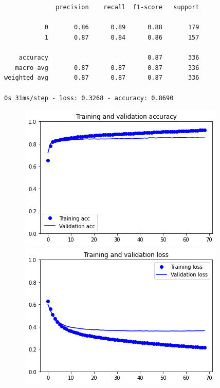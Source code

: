 \documentclass{article}
\begin{document}
\begin{verbatim}


              precision    recall  f1-score   support

           0       0.86      0.89      0.88       179
           1       0.87      0.84      0.86       157

    accuracy                           0.87       336
   macro avg       0.87      0.87      0.87       336
weighted avg       0.87      0.87      0.87       336

0s 31ms/step - loss: 0.3268 - accuracy: 0.8690

\end{verbatim}


\begin{figure}[h]
    \centering
    \begin{minipage}{0.45\textwidth}
        \centering
        \includegraphics[scale=0.46]{./img/preTrainValInception_fe.png}
    \end{minipage}\hfill
    \begin{minipage}{0.45\textwidth}
        \centering
        \includegraphics[scale=0.46]{./img/preTrainLossInception_fe.png}
    \end{minipage}
\end{figure}
\end{document}
